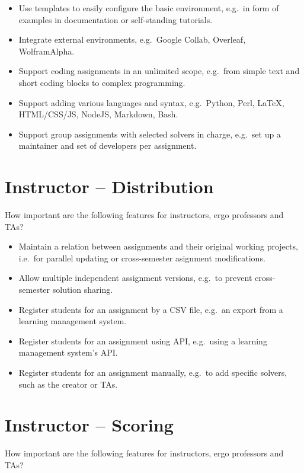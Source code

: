 \begin{itemize}
\item
  Use templates to easily configure the basic environment, e.g.~in form of examples in documentation or self-standing tutorials.
\item
  Integrate external environments, e.g.~Google Collab, Overleaf, WolframAlpha.
\item
  Support coding assignments in an unlimited scope, e.g.~from simple text and short coding blocks to complex programming.
\item
  Support adding various languages and syntax, e.g.~Python, Perl, LaTeX, \\ HTML/CSS/JS, NodeJS, Markdown, Bash.
\item
  Support group assignments with selected solvers in charge, e.g.~set up a maintainer and set of developers per assignment.
\end{itemize}

\section{Instructor -- Distribution}\label{sec:instructor-distribution}

How important are the following features for instructors, ergo professors and TAs?

\begin{itemize}
\item
  Maintain a relation between assignments and their original working projects, i.e.~for parallel updating or cross-semester asignment modifications.
\item
  Allow multiple independent assignment versions, e.g.~to prevent cross-semester solution sharing.
\item
  Register students for an assignment by a CSV file, e.g.~an export from a learning management system.
\item
  Register students for an assignment using API, e.g.~using a learning management system's API.
\item
  Register students for an assignment manually, e.g.~to add specific solvers, such as the creator or TAs.
\end{itemize}

\section{Instructor -- Scoring}\label{sec:instructor-scoring}

How important are the following features for instructors, ergo professors and TAs?


